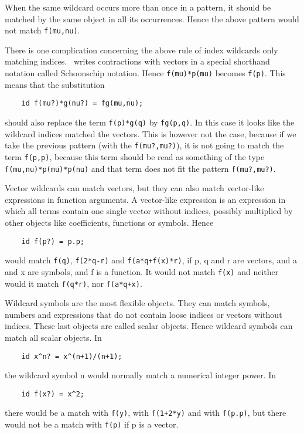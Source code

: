 When the same wildcard occurs more than once in a pattern, it should be 
matched by the same object in all its occurrences. Hence the above pattern 
would not match \verb:f(mu,nu):.

There is one complication concerning the above rule of index wildcards only 
matching indices. \FORM\ writes contractions with vectors in a special 
shorthand notation called Schoonschip notation. Hence 
\verb:f(mu)*p(mu): becomes \verb:f(p):. This means that the substitution
\begin{verbatim}
    id f(mu?)*g(nu?) = fg(mu,nu);
\end{verbatim}
should also replace the term \verb:f(p)*g(q): by \verb:fg(p,q):. In this 
case it looks like the wildcard indices matched the vectors. This is 
however not the case, because if we take the previous pattern (with the 
\verb:f(mu?,mu?):), it is not going to match the term \verb:f(p,p):, 
because this term should be read as something of the type
\verb:f(mu,nu)*p(mu)*p(nu):
and that term does not fit the pattern \verb:f(mu?,mu?):.

Vector wildcards can match vectors, but they can 
also match vector-like expressions in function arguments. A vector-like 
expression is an expression in which all terms contain one single vector 
without indices, possibly multiplied by other objects like coefficients, 
functions or symbols. Hence
\begin{verbatim}
    id f(p?) = p.p;
\end{verbatim}
would match \verb:f(q):, \verb:f(2*q-r): and \verb:f(a*q+f(x)*r):, if p, q 
and r are vectors, and a and x are symbols, and f is a function. It would 
not match \verb:f(x): and neither would it match \verb:f(q*r):, nor 
\verb:f(a*q+x):.

Wildcard symbols are the most flexible objects. They 
can match symbols, numbers and expressions that do not contain loose 
indices or vectors without indices. These last objects are called 
scalar objects. Hence wildcard symbols can match all 
scalar objects. In
\begin{verbatim}
    id x^n? = x^(n+1)/(n+1);
\end{verbatim}
the wildcard symbol n would normally match a numerical integer power. In
\begin{verbatim}
    id f(x?) = x^2;
\end{verbatim}
there would be a match with \verb:f(y):, with \verb:f(1+2*y): and with 
\verb:f(p.p):, but there would not be a match with \verb:f(p): if p is a 
vector.

